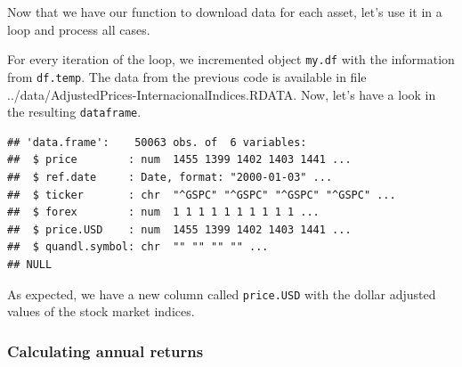 \documentclass[11pt,]{book}
\newenvironment{Shaded}{\begin{snugshade}}{\end{snugshade}}
\newcommand{\KeywordTok}[1]{\textcolor[rgb]{0.27,0.27,0.27}{\textbf{#1}}}
\newcommand{\DataTypeTok}[1]{\textcolor[rgb]{0.27,0.27,0.27}{#1}}
\newcommand{\DecValTok}[1]{\textcolor[rgb]{0.06,0.06,0.06}{#1}}
\newcommand{\StringTok}[1]{\textcolor[rgb]{0.5,0.5,0.5}{#1}}
\newcommand{\ControlFlowTok}[1]{\textcolor[rgb]{0.13,0.29,0.53}{\textbf{#1}}}
\newcommand{\OperatorTok}[1]{\textcolor[rgb]{0.81,0.36,0.00}{\textbf{#1}}}
\newcommand{\NormalTok}[1]{#1}
\begin{document}
Now that we have our function to download data for each asset, let's use
it in a loop and process all cases.

\begin{Shaded}
\end{Shaded}

For every iteration of the loop, we incremented object \texttt{my.df}
with the information from \texttt{df.temp}. The data from the previous
code is available in file
../data/AdjustedPrices-InternacionalIndices.RDATA. Now, let's have a
look in the resulting \texttt{dataframe}.

\begin{verbatim}
## 'data.frame':    50063 obs. of  6 variables:
##  $ price        : num  1455 1399 1402 1403 1441 ...
##  $ ref.date     : Date, format: "2000-01-03" ...
##  $ ticker       : chr  "^GSPC" "^GSPC" "^GSPC" "^GSPC" ...
##  $ forex        : num  1 1 1 1 1 1 1 1 1 1 ...
##  $ price.USD    : num  1455 1399 1402 1403 1441 ...
##  $ quandl.symbol: chr  "" "" "" "" ...
## NULL
\end{verbatim}

As expected, we have a new column called \texttt{price.USD} with the
dollar adjusted values of the stock market indices.

\subsubsection{Calculating annual
returns}\label{calculating-annual-returns}
\end{document}
